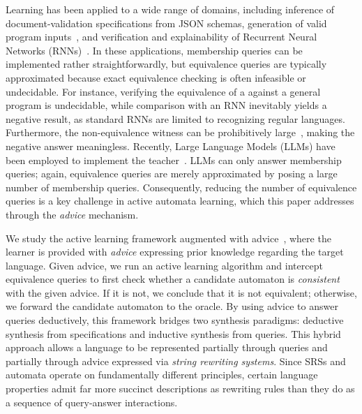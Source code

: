 Learning \VPLs has been applied to a wide range of domains, 
including 
inference of document-validation specifications from JSON schemas, 
generation of valid program inputs~\cite{DBLP:conf/pldi/Bastani0AL17,DBLP:journals/pacmpl/JiaT24}, and 
verification and explainability of Recurrent Neural Networks (RNNs)~\cite{DBLP:conf/icgi/BarbotBFHKLN0Y21}. 
In these applications, membership queries can be implemented rather straightforwardly, but
 equivalence queries are typically approximated because exact equivalence checking is 
often infeasible or undecidable. 
For instance, verifying the equivalence of a \DVPA against a general program is undecidable,
 while comparison with an RNN inevitably yields a negative result, as standard RNNs are limited to recognizing regular languages. 
 Furthermore, the non-equivalence witness can be prohibitively large~\cite{DBLP:conf/emnlp/HewittHGLM20}, 
 making the negative answer meaningless. 
Recently, Large Language Models (LLMs) have been employed to implement the teacher~\cite{learningEL,bhattamishraautomata,vazquezchanlatte2025ll}. 
LLMs can only answer membership queries; again, equivalence queries are merely approximated by posing 
a large number of membership queries.
Consequently, reducing the number of equivalence queries is a key challenge in active automata learning, which 
this paper addresses through the \emph{advice} mechanism.

    
We study the active learning framework augmented with advice~\cite{ecai25}, 
where the learner is provided with \emph{advice} expressing prior knowledge regarding the target language.
Given advice, 
we run an active learning algorithm and intercept equivalence queries to first check whether a candidate automaton 
is \emph{consistent} with the given advice.
If it is not, we conclude that it is not equivalent; otherwise, we forward the candidate automaton to the oracle. 
By using advice to answer queries deductively, this framework bridges two synthesis paradigms:
deductive synthesis from specifications and inductive synthesis from queries. 
This hybrid approach allows a language to be represented partially through queries and 
partially through advice expressed via \emph{string rewriting systems}.
Since SRSs and automata operate on fundamentally different principles, 
certain language properties admit far more succinct descriptions as rewriting rules than they do as a sequence of 
query-answer interactions.



